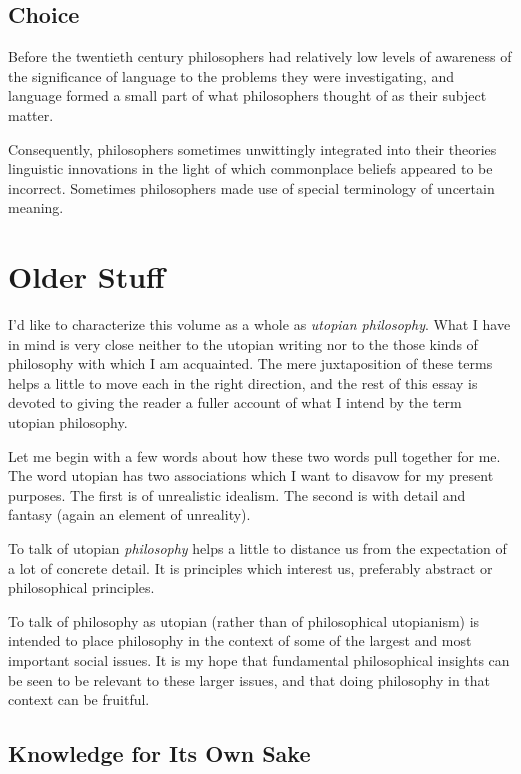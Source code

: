 \subsection{Choice}

Before the twentieth century philosophers had relatively low levels of awareness of the significance of language to the problems they were investigating, and language formed a small part of what philosophers thought of as their subject matter.

Consequently, philosophers sometimes unwittingly integrated into their theories linguistic innovations in the light of which commonplace beliefs appeared to be incorrect.
Sometimes philosophers made use of special terminology of uncertain meaning.

\section{Older Stuff}
I'd like to characterize this volume as a whole as {\it utopian philosophy}.
What I have in mind is very close neither to the utopian writing nor to the those kinds of philosophy with which I am acquainted.
The mere juxtaposition of these terms helps a little to move each in the right direction, and the rest of this essay is devoted to giving the reader a fuller account of what I intend by the term utopian philosophy.

Let me begin with a few words about how these two words pull together for me.
The word utopian has two associations which I want to disavow for my present purposes.
The first is of unrealistic idealism.
The second is with detail and fantasy (again an element of unreality).

To talk of utopian {\it philosophy} helps a little to distance us from the expectation of a lot of concrete detail.
It is principles which interest us, preferably abstract or philosophical principles.

To talk of philosophy as utopian (rather than of philosophical utopianism) is intended to place philosophy in the context of some of the largest and most important social issues.
It is my hope that fundamental philosophical insights can be seen to be relevant to these larger issues, and that doing philosophy in that context can be fruitful.

\subsection{Knowledge for Its Own Sake}

